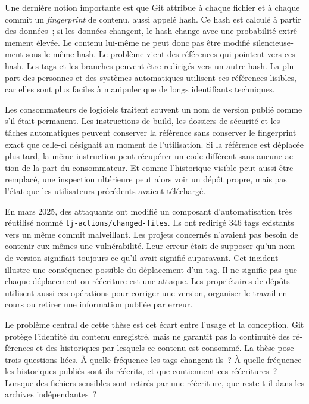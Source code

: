 \begin{otherlanguage}{french}
\begin{SingleSpace}
Une dernière notion importante est que Git attribue à chaque fichier et à chaque commit un \emph{fingerprint} de contenu, aussi appelé hash.
Ce hash est calculé à partir des données~; si les données changent, le hash change avec une probabilité extrêmement élevée.
Le contenu lui-même ne peut donc pas être modifié silencieusement sous le même hash.
Le problème vient des références qui pointent vers ces hash.
Les tags et les branches peuvent être redirigés vers un autre hash.
La plupart des personnes et des systèmes automatiques utilisent ces références lisibles, car elles sont plus faciles à manipuler que de longs identifiants techniques.

Les consommateurs de logiciels traitent souvent un nom de version publié comme s'il était permanent.
Les instructions de build, les dossiers de sécurité et les tâches automatiques peuvent conserver la référence sans conserver le fingerprint exact que celle-ci désignait au moment de l'utilisation.
Si la référence est déplacée plus tard, la même instruction peut récupérer un code différent sans aucune action de la part du consommateur.
Et comme l'historique visible peut aussi être remplacé, une inspection ultérieure peut alors voir un dépôt propre, mais pas l'état que les utilisateurs précédents avaient téléchargé.

En mars 2025, des attaquants ont modifié un composant d'automatisation très réutilisé nommé \texttt{tj-actions/changed-files}.
Ils ont redirigé \num{346} tags existants vers un même commit malveillant.
Les projets concernés n'avaient pas besoin de contenir eux-mêmes une vulnérabilité.
Leur erreur était de supposer qu'un nom de version signifiait toujours ce qu'il avait signifié auparavant.
Cet incident illustre une conséquence possible du déplacement d'un tag.
Il ne signifie pas que chaque déplacement ou réécriture est une attaque.
Les propriétaires de dépôts utilisent aussi ces opérations pour corriger une version, organiser le travail en cours ou retirer une information publiée par erreur.

Le problème central de cette thèse est cet écart entre l'usage et la conception.
Git protège l'identité du contenu enregistré, mais ne garantit pas la continuité des références et des historiques par lesquels ce contenu est consommé.
La thèse pose trois questions liées.
À quelle fréquence les tags changent-ils~?
À quelle fréquence les historiques publiés sont-ils réécrits, et que contiennent ces réécritures~?
Lorsque des fichiers sensibles sont retirés par une réécriture, que reste-t-il dans les archives indépendantes~?


\end{SingleSpace}
\end{otherlanguage}
